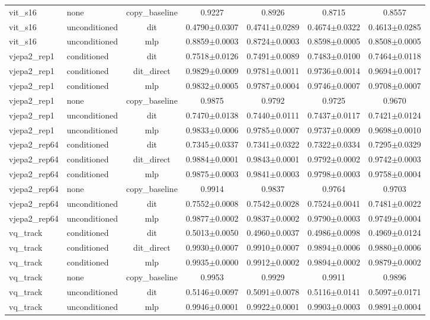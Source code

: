 \begin{table}[ht]
\begin{tabular}{llccccc}
  vit\_s16 & none & copy_baseline & 0.9227 & 0.8926 & 0.8715 & 0.8557 \\
  vit\_s16 & unconditioned & dit & 0.4790$\pm$0.0307 & 0.4741$\pm$0.0289 & 0.4674$\pm$0.0322 & 0.4613$\pm$0.0285 \\
  vit\_s16 & unconditioned & mlp & 0.8859$\pm$0.0003 & 0.8724$\pm$0.0003 & 0.8598$\pm$0.0005 & 0.8508$\pm$0.0005 \\
\midrule
  vjepa2\_rep1 & conditioned & dit & 0.7518$\pm$0.0126 & 0.7491$\pm$0.0089 & 0.7483$\pm$0.0100 & 0.7464$\pm$0.0118 \\
  vjepa2\_rep1 & conditioned & dit_direct & 0.9829$\pm$0.0009 & 0.9781$\pm$0.0011 & 0.9736$\pm$0.0014 & 0.9694$\pm$0.0017 \\
  vjepa2\_rep1 & conditioned & mlp & 0.9832$\pm$0.0005 & 0.9787$\pm$0.0004 & 0.9746$\pm$0.0007 & 0.9708$\pm$0.0007 \\
  vjepa2\_rep1 & none & copy_baseline & 0.9875 & 0.9792 & 0.9725 & 0.9670 \\
  vjepa2\_rep1 & unconditioned & dit & 0.7470$\pm$0.0138 & 0.7440$\pm$0.0111 & 0.7437$\pm$0.0117 & 0.7421$\pm$0.0124 \\
  vjepa2\_rep1 & unconditioned & mlp & 0.9833$\pm$0.0006 & 0.9785$\pm$0.0007 & 0.9737$\pm$0.0009 & 0.9698$\pm$0.0010 \\
\midrule
  vjepa2\_rep64 & conditioned & dit & 0.7345$\pm$0.0337 & 0.7341$\pm$0.0322 & 0.7322$\pm$0.0334 & 0.7295$\pm$0.0329 \\
  vjepa2\_rep64 & conditioned & dit_direct & 0.9884$\pm$0.0001 & 0.9843$\pm$0.0001 & 0.9792$\pm$0.0002 & 0.9742$\pm$0.0003 \\
  vjepa2\_rep64 & conditioned & mlp & 0.9875$\pm$0.0003 & 0.9841$\pm$0.0003 & 0.9798$\pm$0.0003 & 0.9758$\pm$0.0004 \\
  vjepa2\_rep64 & none & copy_baseline & 0.9914 & 0.9837 & 0.9764 & 0.9703 \\
  vjepa2\_rep64 & unconditioned & dit & 0.7552$\pm$0.0008 & 0.7542$\pm$0.0028 & 0.7524$\pm$0.0041 & 0.7481$\pm$0.0022 \\
  vjepa2\_rep64 & unconditioned & mlp & 0.9877$\pm$0.0002 & 0.9837$\pm$0.0002 & 0.9790$\pm$0.0003 & 0.9749$\pm$0.0004 \\
\midrule
  vq\_track & conditioned & dit & 0.5013$\pm$0.0050 & 0.4960$\pm$0.0037 & 0.4986$\pm$0.0098 & 0.4969$\pm$0.0124 \\
  vq\_track & conditioned & dit_direct & 0.9930$\pm$0.0007 & 0.9910$\pm$0.0007 & 0.9894$\pm$0.0006 & 0.9880$\pm$0.0006 \\
  vq\_track & conditioned & mlp & 0.9935$\pm$0.0000 & 0.9912$\pm$0.0002 & 0.9894$\pm$0.0002 & 0.9879$\pm$0.0002 \\
  vq\_track & none & copy_baseline & 0.9953 & 0.9929 & 0.9911 & 0.9896 \\
  vq\_track & unconditioned & dit & 0.5146$\pm$0.0097 & 0.5091$\pm$0.0078 & 0.5116$\pm$0.0141 & 0.5097$\pm$0.0171 \\
  vq\_track & unconditioned & mlp & 0.9946$\pm$0.0001 & 0.9922$\pm$0.0001 & 0.9903$\pm$0.0003 & 0.9891$\pm$0.0004 \\
\bottomrule
\end{tabular}
\end{table}
